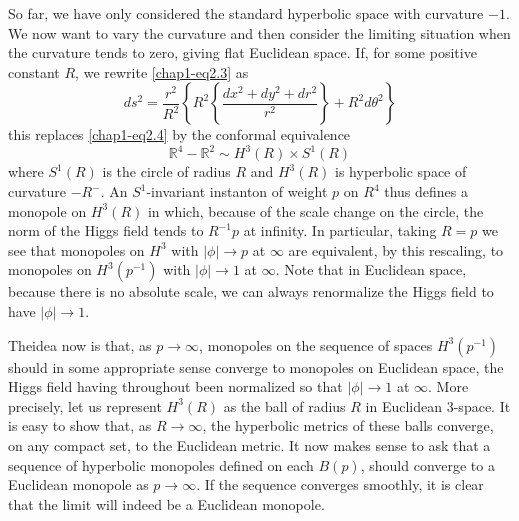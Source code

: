 So far, we have only considered the standard hyperbolic space with
curvature $-1$. We now want to vary the curvature and then consider
the limiting situation when the curvature tends to zero, giving flat
Euclidean space. If, for some positive constant $R$, we rewrite
\eqref{chap1-eq2.3} as 
\begin{equation}
ds^{2}=\dfrac{r^{2}}{R^{2}}\left\{R^{2}\left\{\dfrac{dx^{2}+dy^{2}+dr^{2}}{r^{2}}\right\}+R^{2}d\theta^{2}\right\}\label{chap1-eq5.1} 
\end{equation}
this replaces \eqref{chap1-eq2.4} by the conformal equivalence
\begin{equation}
\mathbb{R}^{4}-\mathbb{R}^{2}\sim H^{3}(R)\times S^{1}(R)\label{chap1-eq5.2}
\end{equation}
where $S^{1}(R)$ is the circle of radius $R$ and $H^{3}(R)$ is
hyperbolic space of curvature $-R^{-}$. An $S^{1}$-invariant instanton
of weight $p$ on $R^{4}$ thus defines a monopole on $H^{3}(R)$ in
which, because of the scale change on the circle, the norm of the
Higgs field tends to $R^{-1}p$ at infinity. In particular, taking
$R=p$ we see that monopoles on $H^{3}$ with $|\phi|\to p$ at $\infty$
are equivalent, by this rescaling, to monopoles on $H^{3}(p^{-1})$
with $|\phi|\to 1$ at $\infty$. Note that in Euclidean space, because
there is no absolute scale, we can always renormalize the Higgs field
to have $|\phi|\to 1$.

The\pageoriginale idea now is that, as $p\to \infty$, monopoles on the
sequence of spaces $H^{3}(p^{-1})$ should in some appropriate sense
converge to monopoles on Euclidean space, the Higgs field having
throughout been normalized so that $|\phi|\to 1$ at $\infty$. More
precisely, let us represent $H^{3}(R)$ as the ball of radius $R$ in
Euclidean 3-space. It is easy to show that, as $R\to \infty$, the
hyperbolic metrics of these balls converge, on any compact set, to the
Euclidean metric. It now makes sense to ask that a sequence of
hyperbolic monopoles defined on each $B(p)$, should converge to a
Euclidean monopole as $p\to \infty$. If the sequence converges
smoothly, it is clear that the limit will indeed be a Euclidean
monopole.

